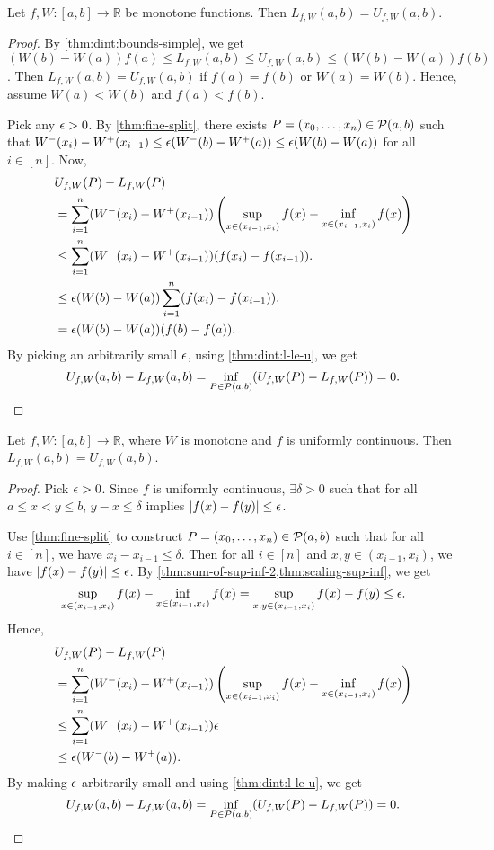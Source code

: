 \documentclass[a4paper,12pt,fleqn]{article}
\begin{document}
\begin{lemma}
\label{thm:dint:monotone}
Let $f, W: [a, b] \to \mathbb{R}$ be monotone functions.
Then $L_{f,W}(a, b) = U_{f,W}(a, b)$.
\end{lemma}
\begin{proof}
By \cref{thm:dint:bounds-simple}, we get
$(W(b)-W(a))f(a) \le L_{f,W}(a, b) \le U_{f,W}(a, b) \le (W(b)-W(a))f(b)$.
Then $L_{f,W}(a, b) = U_{f,W}(a, b)$ if $f(a) = f(b)$ or $W(a) = W(b)$.
Hence, assume $W(a) < W(b)$ and $f(a) < f(b)$.

Pick any $\epsilon > 0$. By \cref{thm:fine-split},
there exists $P = (x_0, \ldots, x_n) \in \mathcal{P}(a, b)$ such that
$W^-(x_i) - W^+(x_{i-1}) \le \epsilon(W^-(b) - W^+(a)) \le \epsilon(W(b) - W(a))$ for all $i \in [n]$.
Now,
\begin{align*}
& U_{f,W}(P) - L_{f,W}(P)
\\ &= \sum_{i=1}^n (W^-(x_i) - W^+(x_{i-1}))
    \left(\sup_{x \in (x_{i-1}, x_i)} f(x) - \inf_{x \in (x_{i-1}, x_i)} f(x)\right)
\\ &\le \sum_{i=1}^n (W^-(x_i) - W^+(x_{i-1}))(f(x_i) - f(x_{i-1})).
\\ &\le \epsilon(W(b)-W(a)) \sum_{i=1}^n (f(x_i) - f(x_{i-1})).
\\ &= \epsilon(W(b)-W(a))(f(b)-f(a)).
\end{align*}
By picking an arbitrarily small $\epsilon$, using \cref{thm:dint:l-le-u}, we get
\[ U_{f,W}(a, b) - L_{f,W}(a, b) = \inf_{P \in \mathcal{P}(a, b)} (U_{f,W}(P) - L_{f,W}(P)) = 0.
\qedhere \]
\end{proof}

\begin{lemma}
\label{thm:dint:unif-cont}
Let $f, W: [a, b] \to \mathbb{R}$, where $W$ is monotone and $f$ is uniformly continuous.
Then $L_{f,W}(a, b) = U_{f,W}(a, b)$.
\end{lemma}
\begin{proof}
Pick $\epsilon > 0$. Since $f$ is uniformly continuous,
$\exists \delta > 0$ such that for all $a \le x < y \le b$,
$y - x \le \delta$ implies $|f(x) - f(y)| \le \epsilon$.

Use \cref{thm:fine-split} to construct
$P = (x_0, \ldots, x_n) \in \mathcal{P}(a, b)$ such that
for all $i \in [n]$, we have $x_i - x_{i-1} \le \delta$.
Then for all $i \in [n]$ and $x, y \in (x_{i-1}, x_i)$,
we have $|f(x) - f(y)| \le \epsilon$.
By \cref{thm:sum-of-sup-inf-2,thm:scaling-sup-inf}, we get
\[ \sup_{x \in (x_{i-1}, x_i)} f(x) - \inf_{x \in (x_{i-1}, x_i)} f(x)
    = \sup_{x, y \in (x_{i-1}, x_i)} f(x) - f(y) \le \epsilon. \]
%
Hence,
\begin{align*}
& U_{f,W}(P) - L_{f,W}(P)
\\ &= \sum_{i=1}^n (W^-(x_i) - W^+(x_{i-1}))
    \left(\sup_{x \in (x_{i-1}, x_i)} f(x) - \inf_{x \in (x_{i-1}, x_i)} f(x)\right)
\\ &\le \sum_{i=1}^n (W^-(x_i) - W^+(x_{i-1}))\epsilon
\\ &\le \epsilon(W^-(b) - W^+(a)).
\end{align*}
By making $\epsilon$ arbitrarily small and using \cref{thm:dint:l-le-u}, we get
\[ U_{f,W}(a, b) - L_{f,W}(a, b) = \inf_{P \in \mathcal{P}(a, b)} (U_{f,W}(P) - L_{f,W}(P)) = 0.
\qedhere \]
\end{proof}
\end{document}
